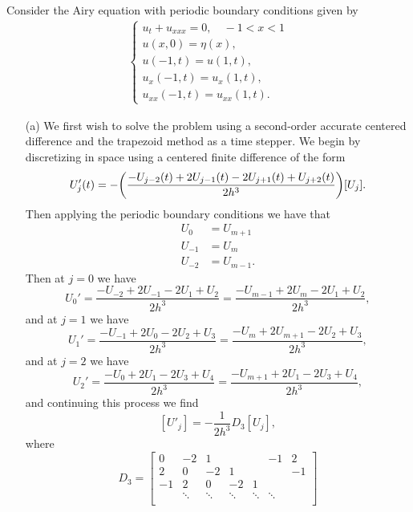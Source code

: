 \documentclass[12pt]{report}
\begin{document}
\begin{solution}

    \noindent
    Consider the Airy equation with periodic boundary conditions given by
    \begin{align*}
        \begin{cases} 
            u_t + u_{xxx} = 0, \quad -1 < x < 1\\
            u(x,0) = \eta(x),\\
            u(-1,t) = u(1,t),\\
            u_x(-1,t) = u_x(1,t),\\
            u_{xx}(-1,t) = u_{xx}(1,t).
        \end{cases}
    \end{align*}
    \begin{enumerate}
        \item [(a)]
        We first wish to solve the problem using a second-order accurate centered difference and the trapezoid method as a time stepper. We begin by discretizing in space using a centered finite difference of the form
        \[
            U_j'(t) = -{\left(\frac{-U_{j-2}(t) + 2U_{j-1}(t) - 2U_{j+1}(t) + U_{j+2}(t)}{2h^3}\right)}[U_j].
        \] 
        Then applying the periodic boundary conditions we have that
        \begin{align*}
            U_0 &= U_{m+1}\\
            U_{-1} &= U_{m}\\
            U_{-2} &= U_{m-1}.
        \end{align*}
        Then at $j=0$ we have
        \[
            U_0' = \frac{-U_{-2} + 2U_{-1} - 2U_{1} + U_{2}}{2h^3} = \frac{-U_{m-1} + 2U_{m} - 2U_{1} + U_{2}}{2h^3},
        \]
        and at $j=1$ we have
        \[
            U_1' = \frac{-U_{-1} + 2U_{0} - 2U_{2} + U_{3}}{2h^3} = \frac{-U_{m} + 2U_{m+1} - 2U_{2} + U_{3}}{2h^3},
        \]
        and at $j=2$ we have
        \[
            U_2' = \frac{-U_{0} + 2U_{1} - 2U_{3} + U_{4}}{2h^3} = \frac{-U_{m+1} + 2U_{1} - 2U_{3} + U_{4}}{2h^3},
        \]
        and continuing this process we find 
        \[
            [U'_j] = -\frac{1}{2h^3}D_3[U_j], 
        \]
        where
        \[
            D_3 = \begin{bmatrix}
            0 & -2 & 1 &&& -1 & 2\\
            2 & 0 & -2 & 1 &&& -1 \\
            -1 & 2 & 0 & -2 & 1 \\
            & \ddots & \ddots & \ddots & \ddots & \ddots \\

\end{bmatrix}\]
\end{enumerate}
\end{solution}
\end{document}
